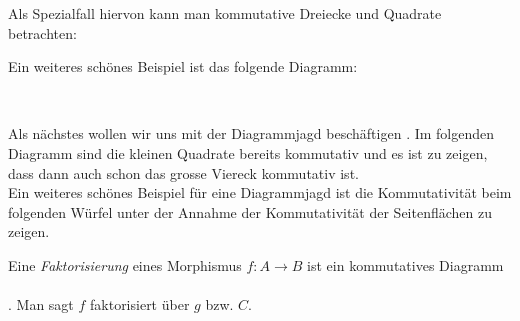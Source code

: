 \documentclass{article}
\begin{document}
\begin{bsp}[Fundamentalgruppoid]
\begin{defi}
		Als Spezialfall hiervon kann man kommutative Dreiecke und Quadrate betrachten:\\
 		 
			
		\end{defi}
			 
		\newpage
		
		Ein weiteres sch\"ones Beispiel ist das folgende Diagramm:
		\begin{bsp} \\
		
		\end{bsp}
		Als n\"achstes wollen wir uns mit der Diagrammjagd besch\"aftigen \cite[Beispiel 2.4.7]{Bra}.
		Im folgenden Diagramm sind die kleinen Quadrate bereits kommutativ und es ist zu zeigen, dass dann auch schon das grosse Viereck kommutativ ist. \\
		
		\newpage
		Ein weiteres sch\"ones Beispiel f\"ur eine Diagrammjagd ist  die Kommutativit\"at beim folgenden W\"urfel \cite[Quellcode]{tikzcd} unter der Annahme der Kommutativit\"at der Seitenfl\"achen zu zeigen. \\
		

	\begin{defi}[Faktorisierung]
	 \cite[Definition 2.4.8]{Bra}
	Eine \emph{Faktorisierung} eines Morphismus \( f:A \to B \) ist ein kommutatives Diagramm \\
		 \\
	. Man sagt $f$ faktorisiert \"uber $g$ bzw. $ C $.
	\end{defi}
\newpage





\end{bsp}
\end{document}
